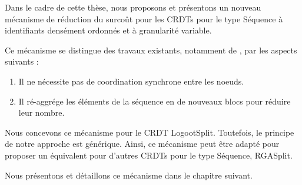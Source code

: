 \label{sec:etat-art-proposition}

Dans le cadre de cette thèse, nous proposons et présentons un nouveau mécanisme de réduction du surcoût pour les \acp{CRDT} pour le type Séquence à identifiants densément ordonnés et à granularité variable.

Ce mécanisme se distingue des travaux existants, notamment de \cite{letia:hal-01248270,zawirski:hal-01248197}, par les aspects suivants :
\begin{enumerate}
    \item Il ne nécessite pas de coordination synchrone entre les noeuds.
    \item Il ré-aggrége les éléments de la séquence en de nouveaux blocs pour réduire leur nombre.
\end{enumerate}

Nous concevons ce mécanisme pour le \ac{CRDT} LogootSplit.
Toutefois, le principe de notre approche est générique.
Ainsi, ce mécanisme peut être adapté pour proposer un équivalent pour d'autres \acp{CRDT} pour le type Séquence, \eg RGASplit.

Nous présentons et détaillons ce mécanisme dans le chapitre suivant.
